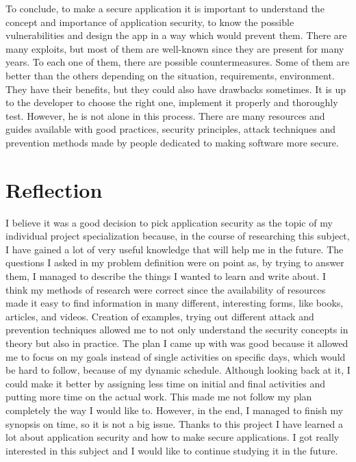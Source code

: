\documentclass[a4paper]{article}
\begin{document}
To conclude, to make a secure application it is important to understand the
concept and importance of application security, to know the possible
vulnerabilities and design the app in a way which would prevent them. There are
many exploits, but most of them are well-known since they are present for many
years. To each one of them, there are possible countermeasures. Some of them are
better than the others depending on the situation, requirements, environment.
They have their benefits, but they could also have drawbacks sometimes. It is up
to the developer to choose the right one, implement it properly and thoroughly
test. However, he is not alone in this process. There are many resources and
guides available with good practices, security principles, attack techniques and
prevention methods made by people dedicated to making software more secure.

\section{Reflection}

I believe it was a good decision to pick application security as the topic of my
individual project specialization because, in the course of researching this
subject, I have gained a lot of very useful knowledge that will help me in the
future. The questions I asked in my problem definition were on point as, by
trying to answer them, I managed to describe the things I wanted to learn and
write about. I think my methods of research were correct since the availability
of resources made it easy to find information in many different, interesting
forms, like books, articles, and videos. Creation of examples, trying out
different attack and prevention techniques allowed me to not only understand the
security concepts in theory but also in practice. The plan I came up with was
good because it allowed me to focus on my goals instead of single activities on
specific days, which would be hard to follow, because of my dynamic schedule.
Although looking back at it, I could make it better by assigning less time on
initial and final activities and putting more time on the actual work. This made
me not follow my plan completely the way I would like to. However, in the end, I
managed to finish my synopsis on time, so it is not a big issue. Thanks to this
project I have learned a lot about application security and how to make secure
applications. I got really interested in this subject and I would like to
continue studying it in the future.
\end{document}
